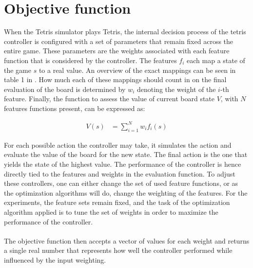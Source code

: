 \section{Objective function}

When the Tetris simulator plays Tetris, the internal decision process
of the tetris controller is configured with a set of parameters that remain
fixed across the entire game. These parameters are the weights associated 
with each feature function that is considered by the controller. The features $f_{i}$
each map a state of the game $s$ to a real value. An overview of the exact mappings
can be seen in table 1 in \citep{scherrer2009:b}. How much each of these mappings
should count in on the final evaluation of the board is determined by $w_{i}$
denoting the weight of the $i$-th feature. Finally, the function to assess the value 
of current board state $V$, with $N$ features functions present, can be expressed as:

\begin{align*}
V(s) &= \sum_{i=1}^{N} w_{i}f_{i}(s)
\end{align*}

For each possible action the controller may take, it simulates 
the action and evaluate the value of the board for the new state. 
The final action is the one that yields the state of the highest value.
The performance of the controller is hence directly tied to the 
features and weights in the evaluation function. To adjust these controllers,
one can either change the set of used feature functions, or as the 
optimization algorithms will do, change the weighting of the features.
For the experiments, the feature sets remain fixed, and the task of the
optimization algorithm applied is to tune the set of weights in order 
to maximize the performance of the controller.\\
\\
The objective function then accepts a vector of values for each weight
and returns a single real number that represents how well the controller
performed while influenced by the input weighting.


